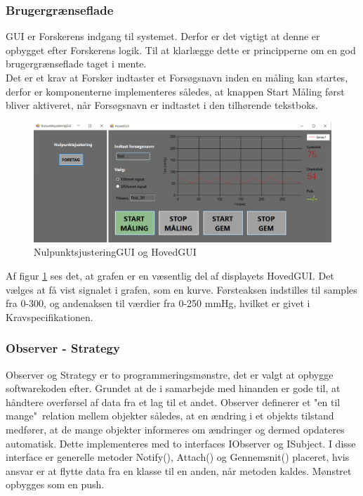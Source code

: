 \subsubsection{Brugergrænseflade}
GUI er Forskerens indgang til systemet. Derfor er det vigtigt at denne er opbygget efter Forskerens logik. Til at klarlægge dette er principperne om en god brugergrænseflade taget i mente. \\
Det er et krav at Forsker indtaster et Forsøgsnavn inden en måling kan startes, derfor er komponenterne implementeres således, at knappen Start Måling først bliver aktiveret, når Forsøgsnavn er indtastet i den tilhørende tekstboks. 
\begin{figure}[H]
	\centering
	\includegraphics[width=1.0\textwidth]{Figurer/NulHovedGUI}
	\caption{NulpunktsjusteringGUI og HovedGUI}
	\label{fig:FormsSW}
\end{figure}
Af figur \ref{fig:FormsSW} ses det, at grafen er en væsentlig del af displayets HovedGUI. Det vælges at få vist signalet i grafen, som en kurve. Førsteaksen indstilles til samples fra 0-300, og andenaksen til værdier fra 0-250 mmHg, hvilket er givet i Kravspecifikationen. 

\subsubsection{Observer - Strategy}
Observer og Strategy er to programmeringsmønstre, det er valgt at opbygge softwarekoden efter. Grundet at de i samarbejde med hinanden er gode til, at håndtere overførsel af data fra et lag til et andet. Observer definerer et "en til mange"\ relation mellem objekter således, at en ændring i et objekts tilstand medfører, at de mange objekter informeres om ændringer og dermed opdateres automatisk. Dette implementeres med to interfaces IObserver og ISubject. I disse interface er generelle metoder Notify(), Attach() og Gennemsnit() placeret, hvis ansvar er at flytte data fra en klasse til en anden, når metoden kaldes. Mønstret opbygges som en push.

